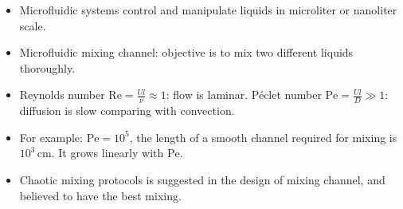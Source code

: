 \documentclass[dvips,landscape]{foils}
\begin{document}
 
\begin{itemize}
\item Microfluidic systems control and manipulate liquids in microliter or nanoliter scale.
\item Microfluidic mixing channel: objective is to mix two different liquids thoroughly.
\item Reynolds number $\text{Re} = \frac{Ul}{\nu}\approx 1$: flow is laminar.  P\'{e}clet number $\text{Pe} = \frac{Ul}{D} \gg 1$: diffusion is slow comparing with convection.
\item For example: $\text{Pe}=10^5$, the length of a smooth channel required for mixing is $10^3\,\text{cm}$. It grows linearly with $\text{Pe}$.
\item Chaotic mixing protocols is suggested in the design of mixing channel, and believed to have the best mixing.
\end{itemize}
\end{document}
